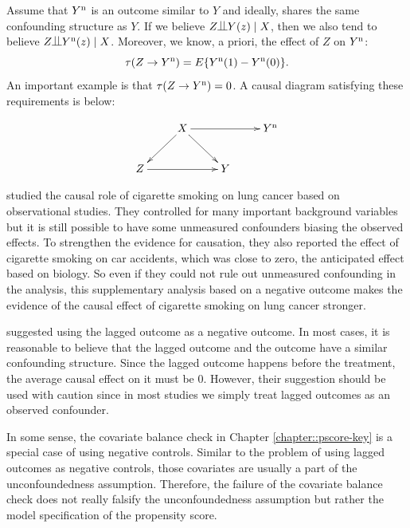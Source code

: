  

Assume that $Y^\textup{n}$ is an outcome similar to $Y$ and ideally, shares the same confounding structure as $Y$. If we believe $Z\ind Y(z)\mid X$, then we also tend to believe $Z\ind Y^\textup{n} (z)\mid X$.
Moreover, we know, a priori, the effect of $Z$ on $Y^\textup{n}$:
$$
\tau(Z\rightarrow Y^\textup{n} )
= 
E\{  Y^\textup{n}(1) - Y^\textup{n}(0) \} .
$$
An important example is that $\tau(Z\rightarrow Y^\textup{n} ) = 0$. A causal diagram satisfying these requirements is below:

$$
\xymatrix{
 & X \ar[ld]\ar[rd] \ar[rr] & & Y^\textup{n}  \\
Z\ar[rr] &&Y 
}
$$



\begin{example}
\citet{Cornfield::1959} studied the causal role of cigarette smoking on lung cancer based on observational studies. They controlled for many important background variables but it is still possible to have some unmeasured confounders biasing the observed effects. To strengthen the evidence for causation, they also reported the effect of cigarette smoking on car accidents, which was close to zero, the anticipated effect based on biology. So even if they could not rule out unmeasured confounding in the analysis, this supplementary analysis based on a negative outcome makes the evidence of the causal effect of cigarette smoking on lung cancer stronger. 
\end{example}

\begin{example}
\citet{imbens2015causal} suggested using the lagged outcome as a negative outcome. In most cases, it is reasonable to believe that the lagged outcome and the outcome have a similar confounding structure. Since the lagged outcome happens before the treatment, the average causal effect on it must be $0$. However, their suggestion should be used with caution since in most studies we simply treat lagged outcomes as an observed confounder. 

In some sense, the covariate balance check in Chapter \ref{chapter::pscore-key} is a special case of using negative controls. Similar to the problem of using lagged outcomes as negative controls, those covariates are usually a part of the unconfoundedness assumption. Therefore, the failure of the covariate balance check does not really falsify the unconfoundedness assumption but rather the model specification of the propensity score. 
\end{example}

